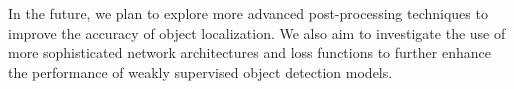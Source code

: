 \documentclass[conference]{IEEEtran}
\begin{document}
In the future, we plan to explore more advanced post-processing techniques to improve the accuracy of object localization. We also aim to investigate the use of more sophisticated network architectures and loss functions to further enhance the performance of weakly supervised object detection models.




\end{document}
